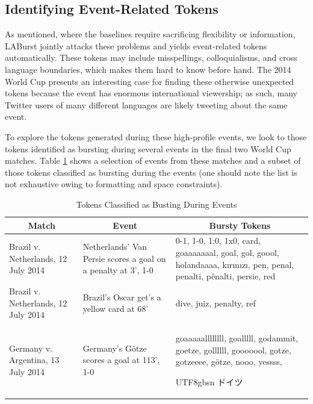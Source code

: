 \documentclass[letterpaper]{article}
\newcommand{\myfont}{gbsn}
\begin{document}
\subsection{Identifying Event-Related Tokens}

As mentioned, where the baselines require sacrificing flexibility or information, LABurst jointly attacks these problems and yields event-related tokens automatically.
These tokens may include misspellings, colloquialisms, and cross language boundaries, which makes them hard to know before hand.
The 2014 World Cup presents an interesting case for finding these otherwise unexpected tokens because the event has enormous international viewership; as such, many Twitter users of many different languages are likely tweeting about the same event.

To explore the tokens generated during these high-profile events, we look to those tokens identified as bursting during several events in the final two World Cup matches.
Table \ref{tab:burstyTokens} shows a selection of events from these matches and a subset of those tokens classified as bursting during the events (one should note the list is not exhaustive owing to formatting and space constraints).

\begin{table}[htdp]
\caption{Tokens Classified as Busting During Events}
\begin{center}
\begin{tabular}{|p{0.75in}|p{0.7in}| p{1.45in} |}
\hline
\multicolumn{1}{|c|}{\textbf{Match}} & \multicolumn{1}{|c|}{\textbf{Event}} & \multicolumn{1}{|c|}{\textbf{Bursty Tokens}} \\ \hline
Brazil v. Netherlands, 12 July 2014 & Netherlands' Van Persie scores a goal on a penalty at 3', 1-0 & 0-1, 1-0, 1:0, 1x0, card, goaaaaaaal, goal, gol, goool, holandaaaa, k\i{}rm\i{}z\i{}, pen, penal, penalti, p\^{e}nalti, persie, red \\ \hline
Brazil v. Netherlands, 12 July 2014 & Brazil's Oscar get's a yellow card at 68' & dive, juiz, penalty, ref \\ \hline
Germany v. Argentina, 13 July 2014 & Germany's G\"{o}tze scores a goal at 113', 1-0 & goaaaaallllllll, goalllll, godammit, goetze, gollllll, gooooool, gotze, gotzeeee, g\"{o}tze, nooo, yessss, \begin{CJK}{UTF8}{\myfont} ドイツ\end{CJK} \\ \hline
\end{tabular}
\end{center}
\label{tab:burstyTokens}
\end{table}
\end{document}
